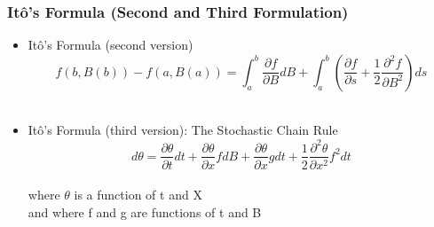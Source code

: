 \begin{frame}
  \frametitle{It\^o's Formula (Second and Third Formulation)}
  \begin{itemize}
  \item  It\^o's Formula (second version) $$f(b,B(b))-f(a,B(a))=\int_{a}^{b}{\frac{\partial f}{\partial B} dB}+\int_{a}^{b}{(\frac{\partial f}{\partial s}+\frac{1}{2}\frac{\partial ^2 f}{\partial B^2}) ds}$$\\
  \item  It\^o's Formula (third version): The Stochastic Chain Rule $$d\theta=\frac{\partial\theta}{\partial t}dt+\frac{\partial\theta}{\partial x}f dB+\frac{\partial\theta}{\partial x}g dt+\frac{1}{2}\frac{\partial^2\theta}{\partial x^2}f^2dt$$\\
  where $\theta$ is a function of t and X\\
  and where f and g are functions of t and B
  \end{itemize}
  
\end{frame}








\
